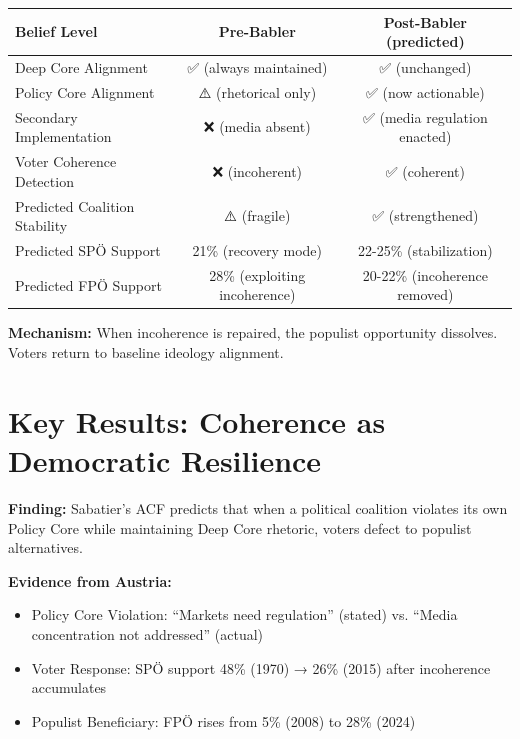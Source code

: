 \begin{table}[h]
\centering
\small
\renewcommand{\arraystretch}{1.4}
\begin{tabular}{@{}lcc@{}}
\toprule
\textbf{Belief Level} & \textbf{Pre-Babler} & \textbf{Post-Babler (predicted)} \\
\midrule
Deep Core Alignment & ✅ (always maintained) & ✅ (unchanged) \\
Policy Core Alignment & ⚠️ (rhetorical only) & ✅ (now actionable) \\
Secondary Implementation & ❌ (media absent) & ✅ (media regulation enacted) \\
Voter Coherence Detection & ❌ (incoherent) & ✅ (coherent) \\
\midrule
Predicted Coalition Stability & ⚠️ (fragile) & ✅ (strengthened) \\
Predicted SPÖ Support & 21\% (recovery mode) & 22-25\% (stabilization) \\
Predicted FPÖ Support & 28\% (exploiting incoherence) & 20-22\% (incoherence removed) \\
\bottomrule
\end{tabular}
\end{table}

\textbf{Mechanism:} When incoherence is repaired, the populist opportunity dissolves. Voters return to baseline ideology alignment.


\section{Key Results: Coherence as Democratic Resilience}
\label{sec:cj-results}

\begin{tcolorbox}[colback=green!5!white, colframe=green!75!black,
    title=Result CJ-R1: Incoherence Predicts Populist Activation]

\textbf{Finding:} Sabatier's ACF predicts that when a political coalition violates its own Policy Core while maintaining Deep Core rhetoric, voters defect to populist alternatives.

\textbf{Evidence from Austria:}
\begin{itemize}
\item Policy Core Violation: ``Markets need regulation'' (stated) vs. ``Media concentration not addressed'' (actual)
\item Voter Response: SPÖ support 48\% (1970) → 26\% (2015) after incoherence accumulates
\item Populist Beneficiary: FPÖ rises from 5\% (2008) to 28\% (2024)
\end{itemize}

\end{tcolorbox}

